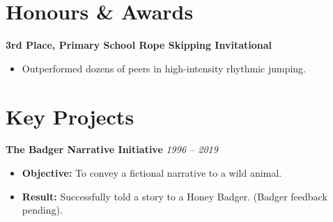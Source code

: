 \documentclass[11pt, a4paper]{article}
\begin{document}
\section{Honours \& Awards}
\textbf{3rd Place, Primary School Rope Skipping Invitational} 
\begin{itemize}
    \item Outperformed dozens of peers in high-intensity rhythmic jumping.
\end{itemize}

\section{Key Projects}
\textbf{The Badger Narrative Initiative} \hfill \textit{1996 -- 2019}
\begin{itemize}
    \item \textbf{Objective:} To convey a fictional narrative to a wild animal.
    \item \textbf{Result:} Successfully told a story to a Honey Badger. (Badger feedback pending).
\end{itemize}
\end{document}
